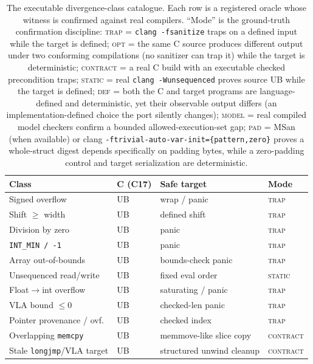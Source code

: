 \documentclass[10pt,a4paper]{article}
\begin{document}
\begin{table}[t]
\centering
\small
\caption{The executable divergence-class catalogue. Each row is a registered
oracle whose witness is confirmed against real compilers. ``Mode'' is the
ground-truth confirmation discipline: \textsc{trap} = \texttt{clang -fsanitize}
traps on a defined input while the target is defined; \textsc{opt} = the same C
source produces different output under two conforming compilations (no sanitizer
can trap it) while the target is deterministic; \textsc{contract} = a real C
build with an executable checked precondition traps; \textsc{static} =
real \texttt{clang -Wunsequenced} proves source UB while the target is defined;
\textsc{def} = both
the C and target programs are language-defined and deterministic, yet their
observable output differs (an implementation-defined choice the port silently
changes); \textsc{model} = real compiled model checkers confirm a bounded
allowed-execution-set gap; \textsc{pad} = MSan (when available) or clang
\texttt{-ftrivial-auto-var-init=\{pattern,zero\}} proves a whole-struct digest
depends specifically on padding bytes, while a zero-padding control and target
serialization are deterministic.}
\label{tab:divergences}
\begin{tabular}{@{}llll@{}}
\toprule
Class & C (C17) & Safe target & Mode \\
\midrule
Signed overflow            & UB & wrap / panic        & \textsc{trap} \\
Shift $\geq$ width          & UB & defined shift       & \textsc{trap} \\
Division by zero           & UB & panic               & \textsc{trap} \\
\texttt{INT\_MIN / -1}     & UB & panic               & \textsc{trap} \\
Array out-of-bounds        & UB & bounds-check panic  & \textsc{trap} \\
Unsequenced read/write     & UB & fixed eval order    & \textsc{static} \\
Float$\to$int overflow     & UB & saturating / panic  & \textsc{trap} \\
VLA bound $\leq 0$         & UB & checked-len panic   & \textsc{trap} \\
Pointer provenance / ovf.  & UB & checked index       & \textsc{trap} \\
Overlapping \texttt{memcpy} & UB & memmove-like slice copy & \textsc{contract} \\
Stale \texttt{longjmp}/VLA target & UB & structured unwind cleanup & \textsc{contract} \\

\end{tabular}
\end{table}
\end{document}
